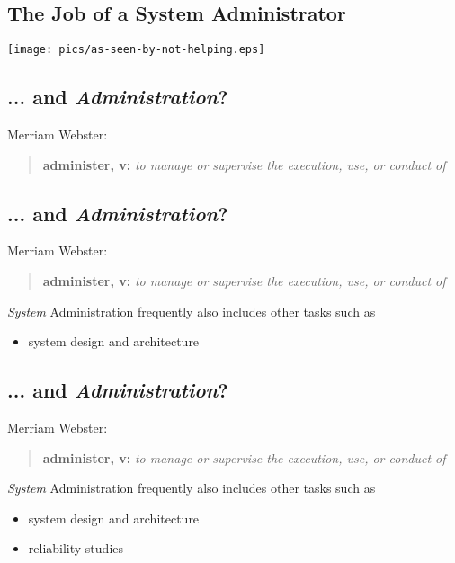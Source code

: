 \documentclass[xga]{xdvislides}
\begin{document}
\subsection{The Job of a System Administrator}
\vspace*{\fill}
\begin{center}
	\texttt{[image: pics/as-seen-by-not-helping.eps]} \\
\end{center}
\vspace*{\fill}

\subsection{... and {\em Administration}?}
Merriam Webster:
\begin{quote}
	{\bf administer, v:} {\em to manage or supervise the execution, use, or conduct of} \\
\end{quote}


\subsection{... and {\em Administration}?}
Merriam Webster:
\begin{quote}
	{\bf administer, v:} {\em to manage or supervise the execution, use, or conduct of} \\
\end{quote}

{\em System} Administration frequently also includes other tasks such as
\begin{itemize}
	\item system design and architecture
\end{itemize}

\subsection{... and {\em Administration}?}
Merriam Webster:
\begin{quote}
	{\bf administer, v:} {\em to manage or supervise the execution, use, or conduct of} \\
\end{quote}

{\em System} Administration frequently also includes other tasks such as
\begin{itemize}
	\item system design and architecture
	\item reliability studies
\end{itemize}
\end{document}
